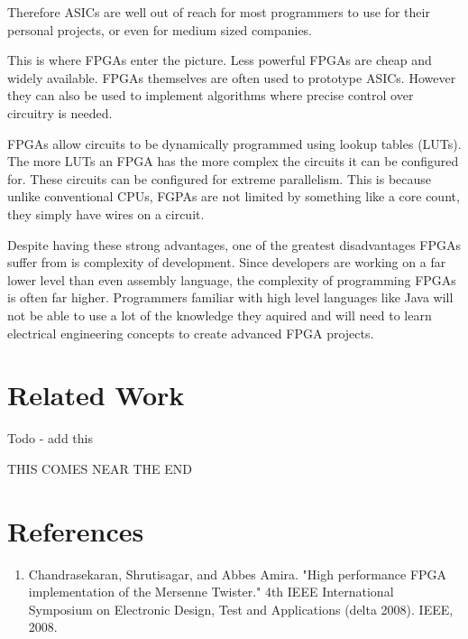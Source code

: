 \documentclass{article}
\begin{document}
\begin{multicols}{2}
    Therefore ASICs are well out of reach for most programmers to use for their personal projects, or even for
    medium sized companies.

    This is where FPGAs enter the picture. Less powerful FPGAs are cheap and widely available. FPGAs themselves
    are often used to prototype ASICs. However they can also be used to implement algorithms where precise control
    over circuitry is needed.

    FPGAs allow circuits to be dynamically programmed using lookup tables (LUTs). The more LUTs an FPGA
    has the more complex the circuits it can be configured for. These circuits can be configured for
    extreme parallelism. This is because unlike conventional CPUs, FGPAs are not limited by something like a core count,
    they simply have wires on a circuit.

    Despite having these strong advantages, one of the greatest disadvantages FPGAs suffer from is complexity of development.
    Since developers are working on a far lower level than even assembly language, the complexity
    of programming FPGAs is often far higher. Programmers familiar with high level languages
    like Java will not be able to use a lot of the knowledge they aquired and will need to learn electrical engineering
    concepts to create advanced FPGA projects.
    
    \section{Related Work}

    Todo - add this

    THIS COMES NEAR THE END

    
    \end{multicols}

    \break
    \section*{References}

    \begin{enumerate}

    \item Chandrasekaran, Shrutisagar, and Abbes Amira. "High performance FPGA implementation of the Mersenne Twister." 4th IEEE International Symposium on Electronic Design, Test and Applications (delta 2008). IEEE, 2008.

    \end{enumerate}
    
\end{document}
